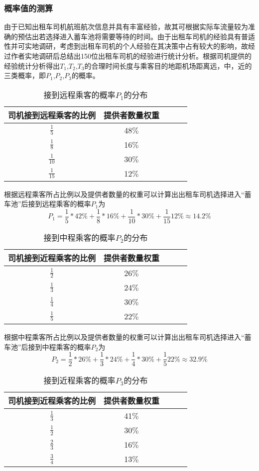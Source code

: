\documentclass[withoutpreface,bwprint]{cumcmthesis} %
\begin{document}
\subsubsection{概率值的测算}
由于已知出租车司机航班航次信息并具有丰富经验，故其可根据实际车流量较为准确的预估出若选择进入蓄车池将需要等待的时间。由于出租车司机的经验具有普适性并可实地调研，考虑到出租车司机的个人经验在其决策中占有较大的影响，故经过作者实地调研后总结出150位出租车司机的经验进行统计分析。根据司机提供的经验统计分析得出$T_1$,$T_2$,$T_3$的合理时间长度与乘客目的地距机场距离远，中，近的三类概率，即$P_1$,$P_2$,$P_3$的概率。
\begin{table}[!htbp]
	\caption{接到远程乘客的概率$P_1$的分布}\label{tab:001} \centering
	\begin{tabular}{ccccc}
		\toprule[1.5pt]
		司机接到远程乘客的比例& 提供者数量权重\\
		\midrule[1pt]
		$\frac{1}{5}$ & 48$\%$\\
		$\frac{1}{8}$ & 16$\%$\\
		$\frac{1}{10}$ & 30$\%$\\
		$\frac{1}{15}$ & 12$\%$\\
		\bottomrule[1.5pt]
	\end{tabular}
\end{table}

根据远程乘客所占比例以及提供者数量的权重可以计算出出租车司机选择进入“蓄车池”后接到远程乘客的概率$P_1$为
$$
P_{1}=\frac{1}{5} * 42 \%+\frac{1}{8} * 16 \%+\frac{1}{10} * 30 \%+\frac{1}{15} 12 \% \approx 14.2 \%
$$

\begin{table}[!htbp]
	\caption{接到中程乘客的概率$P_2$的分布}\label{tab:001} \centering
	\begin{tabular}{ccccc}
		\toprule[1.5pt]
		司机接到近程乘客的比例& 提供者数量权重\\
		\midrule[1pt]
		$\frac{1}{2}$ & 26$\%$\\
		$\frac{1}{3}$ & 24$\%$\\
		$\frac{1}{4}$ & 30$\%$\\
		$\frac{1}{5}$ & 22$\%$\\
		\bottomrule[1.5pt]
	\end{tabular}
\end{table}

根据中程乘客所占比例以及提供者数量的权重可以计算出出租车司机选择进入“蓄车池”后接到中程乘客的概率$P_2$为
$$
P_{2}=\frac{1}{2} * 26 \%+\frac{1}{3} * 24 \%+\frac{1}{4} * 30 \%+\frac{1}{5} 22 \% \approx 32.9 \%
$$

\begin{table}[!htbp]
	\caption{接到近程乘客的概率$P_3$的分布}\label{tab:001} \centering
	\begin{tabular}{ccccc}
		\toprule[1.5pt]
		司机接到近程乘客的比例& 提供者数量权重\\
		\midrule[1pt]
		$\frac{1}{3}$ & 41$\%$\\
		$\frac{1}{2}$ & 30$\%$\\
		$\frac{2}{3}$ & 16$\%$\\
		$\frac{3}{4}$ & 13$\%$\\
		\bottomrule[1.5pt]
	\end{tabular}
\end{table}
\end{document}
